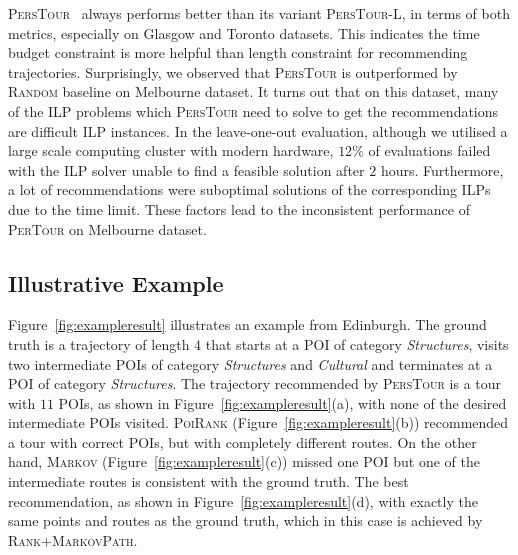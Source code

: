 \textsc{PersTour}~\cite{ijcai15} always performs better than its variant \textsc{PersTour-L},
in terms of both metrics, especially on Glasgow and Toronto datasets.
This indicates the time budget constraint is more helpful than length constraint for recommending trajectories.
Surprisingly, we observed that \textsc{PersTour} is outperformed by \textsc{Random} baseline on Melbourne dataset. %
It turns out that on this dataset, many of the ILP problems
which \textsc{PersTour} need to solve to get the recommendations are difficult ILP instances.
In the leave-one-out evaluation, although we utilised a large scale computing cluster with modern hardware,
$12\%$ of evaluations failed with the ILP solver unable to find a feasible solution after $2$ hours.
Furthermore, a lot of recommendations were suboptimal solutions of the corresponding ILPs due to
the time limit. These factors lead to the inconsistent performance of \textsc{PerTour} on Melbourne dataset.



\subsection{Illustrative Example}
\label{sec:example}
\secmoveup



Figure~\ref{fig:exampleresult} illustrates an example %
from Edinburgh.
The ground truth is a trajectory of length $4$ that starts at a POI of category \textit{Structures},
visits two intermediate POIs of category \textit{Structures} and \textit{Cultural} and
terminates at a POI of category \textit{Structures}.
The trajectory recommended by \textsc{PersTour} is a tour with $11$ POIs, as shown in Figure~\ref{fig:exampleresult}(a),
with none of the desired intermediate POIs visited.
\textsc{PoiRank} (Figure~\ref{fig:exampleresult}(b)) recommended a tour with correct POIs,
but with completely different routes.
On the other hand, \textsc{Markov} (Figure~\ref{fig:exampleresult}(c)) missed one POI
but one of the intermediate routes is consistent with the ground truth.
The best recommendation, as shown in Figure~\ref{fig:exampleresult}(d),
with exactly the same points and routes as the ground truth,
which in this case is achieved by \textsc{Rank+MarkovPath}.
